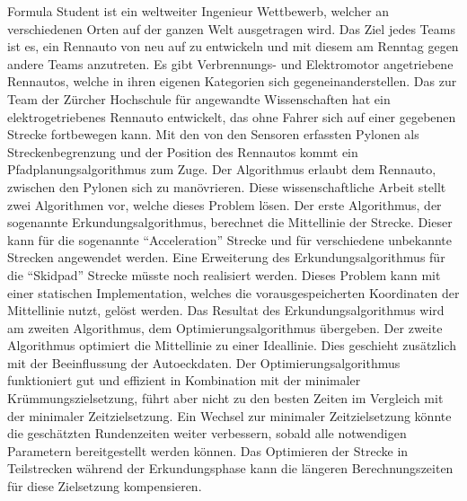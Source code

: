 Formula Student ist ein weltweiter Ingenieur Wettbewerb, welcher an verschiedenen Orten auf der ganzen Welt ausgetragen wird. Das Ziel jedes Teams ist es, ein Rennauto von neu auf zu entwickeln und mit diesem am Renntag gegen andere Teams anzutreten. Es gibt Verbrennungs- und Elektromotor angetriebene Rennautos, welche in ihren eigenen Kategorien sich gegeneinanderstellen. Das \acrlong{zur} Team der Zürcher Hochschule für angewandte Wissenschaften hat ein elektrogetriebenes Rennauto entwickelt, das ohne Fahrer sich auf einer gegebenen Strecke fortbewegen kann. Mit den von den Sensoren erfassten Pylonen als Streckenbegrenzung und der Position des Rennautos kommt ein Pfadplanungsalgorithmus zum Zuge. Der Algorithmus erlaubt dem Rennauto, zwischen den Pylonen sich zu manövrieren. Diese wissenschaftliche Arbeit stellt zwei Algorithmen vor, welche dieses Problem lösen. Der erste Algorithmus, der sogenannte Erkundungsalgorithmus, berechnet die Mittellinie der Strecke. Dieser kann für die sogenannte ``Acceleration'' Strecke und für verschiedene unbekannte Strecken angewendet werden. Eine Erweiterung des Erkundungsalgorithmus für die ``Skidpad'' Strecke müsste noch realisiert werden. Dieses Problem kann mit einer statischen Implementation, welches die vorausgespeicherten Koordinaten der Mittellinie nutzt, gelöst werden. Das Resultat des Erkundungsalgorithmus wird am zweiten Algorithmus, dem Optimierungsalgorithmus übergeben. Der zweite Algorithmus optimiert die Mittellinie zu einer Ideallinie. Dies geschieht zusätzlich mit der Beeinflussung der Autoeckdaten. Der Optimierungsalgorithmus funktioniert gut und effizient in Kombination mit der minimaler Krümmungszielsetzung, führt aber nicht zu den besten Zeiten im Vergleich mit der minimaler Zeitzielsetzung. Ein Wechsel zur minimaler Zeitzielsetzung könnte die geschätzten Rundenzeiten weiter verbessern, sobald alle notwendigen Parametern bereitgestellt werden können. Das Optimieren der Strecke in Teilstrecken während der Erkundungsphase kann die längeren Berechnungszeiten für diese Zielsetzung kompensieren.
